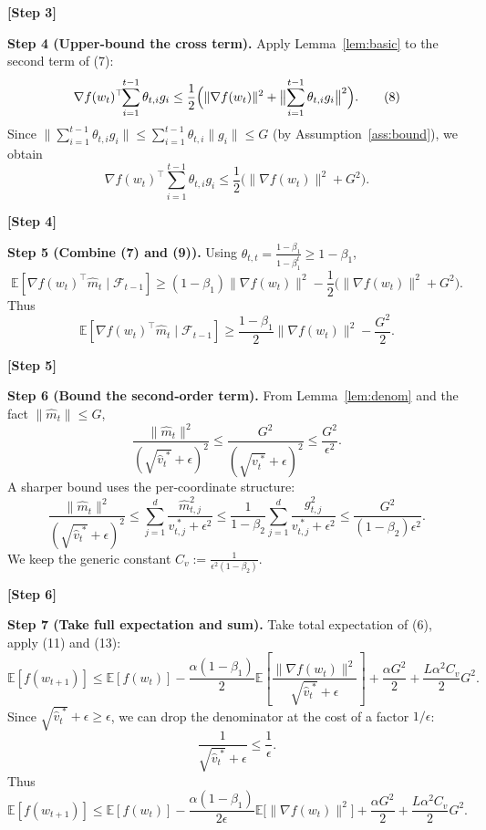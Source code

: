 \documentclass{article}
\newcommand{\E}{\mathbb{E}}
\begin{document}
\textbf{[Step 3]}

\medskip
\noindent\textbf{Step 4 (Upper‑bound the cross term).}  
Apply Lemma~\ref{lem:basic} to the second term of (7):
\[
\nabla f(w_{t})^{\top}\!\!\sum_{i=1}^{t-1}\theta_{t,i}g_{i}
\le \frac{1}{2}\Bigl(\|\nabla f(w_{t})\|^{2}
          +\bigl\|\sum_{i=1}^{t-1}\theta_{t,i}g_{i}\bigr\|^{2}\Bigr). \tag{8}
\]
Since $\|\sum_{i=1}^{t-1}\theta_{t,i}g_{i}\|\le\sum_{i=1}^{t-1}\theta_{t,i}\|g_{i}\|
\le G$ (by Assumption~\ref{ass:bound}), we obtain
\[
\nabla f(w_{t})^{\top}\!\!\sum_{i=1}^{t-1}\theta_{t,i}g_{i}
\le \frac{1}{2}\bigl(\|\nabla f(w_{t})\|^{2}+G^{2}\bigr). \tag{9}
\]

\textbf{[Step 4]}

\medskip
\noindent\textbf{Step 5 (Combine (7) and (9)).}  
Using $\theta_{t,t}= \frac{1-\beta_{1}}{1-\beta_{1}^{t}}\ge 1-\beta_{1}$,
\[
\E\!\left[\nabla f(w_{t})^{\top}\hat m_{t}\mid\mathcal{F}_{t-1}\right]
\ge (1-\beta_{1})\|\nabla f(w_{t})\|^{2}
    -\frac{1}{2}\bigl(\|\nabla f(w_{t})\|^{2}+G^{2}\bigr). \tag{10}
\]
Thus
\[
\E\!\left[\nabla f(w_{t})^{\top}\hat m_{t}\mid\mathcal{F}_{t-1}\right]
\ge \frac{1-\beta_{1}}{2}\|\nabla f(w_{t})\|^{2}
     -\frac{G^{2}}{2}. \tag{11}
\]

\textbf{[Step 5]}

\medskip
\noindent\textbf{Step 6 (Bound the second‑order term).}  
From Lemma~\ref{lem:denom} and the fact $\|\hat m_{t}\|\le G$,
\[
\frac{\|\hat m_{t}\|^{2}}{(\sqrt{\hat v_{t}^{\;*}}+\epsilon)^{2}}
\le \frac{G^{2}}{(\sqrt{v_{t}^{\;*}}+\epsilon)^{2}}
\le \frac{G^{2}}{\epsilon^{2}}. \tag{12}
\]
A sharper bound uses the per‑coordinate structure:
\[
\frac{\|\hat m_{t}\|^{2}}{(\sqrt{\hat v_{t}^{\;*}}+\epsilon)^{2}}
\le \sum_{j=1}^{d}\frac{\hat m_{t,j}^{2}}{v_{t,j}^{\;*}+\epsilon^{2}}
\le \frac{1}{1-\beta_{2}}\sum_{j=1}^{d}\frac{g_{t,j}^{2}}{v_{t,j}^{\;*}+\epsilon^{2}}
\le \frac{G^{2}}{(1-\beta_{2})\epsilon^{2}}. \tag{13}
\]
We keep the generic constant $C_{v}:=\frac{1}{\epsilon^{2}(1-\beta_{2})}$.

\textbf{[Step 6]}

\medskip
\noindent\textbf{Step 7 (Take full expectation and sum).}  
Take total expectation of (6), apply (11) and (13):
\[
\E[f(w_{t+1})]\le \E[f(w_{t})]
-\frac{\alpha(1-\beta_{1})}{2}\E\!\left[\frac{\|\nabla f(w_{t})\|^{2}}{\sqrt{\hat v_{t}^{\;*}}+\epsilon}\right]
+\frac{\alpha G^{2}}{2}
+\frac{L\alpha^{2}C_{v}}{2}G^{2}. \tag{14}
\]
Since $\sqrt{\hat v_{t}^{\;*}}+\epsilon\ge \epsilon$, we can drop the denominator at the cost of a factor $1/\epsilon$:
\[
\frac{1}{\sqrt{\hat v_{t}^{\;*}}+\epsilon}\le\frac{1}{\epsilon}. \tag{15}
\]
Thus
\[
\E[f(w_{t+1})]\le \E[f(w_{t})]
-\frac{\alpha(1-\beta_{1})}{2\epsilon}\E\!\bigl[\|\nabla f(w_{t})\|^{2}\bigr]
+\frac{\alpha G^{2}}{2}
+\frac{L\alpha^{2}C_{v}}{2}G^{2}. \tag{16}
\]
\end{document}
